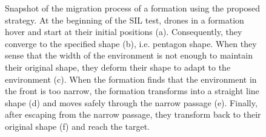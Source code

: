 \begin{figure}[h!]
\begin{subfigure}[b]{0.325\textwidth}
    \caption{}
    \end{subfigure}
    \caption{Snapshot of the migration process of a formation using the proposed strategy. At the beginning of the SIL test, drones in a formation hover and start at their initial positions (a). Consequently, they converge to the specified shape (b), i.e. pentagon shape. When they sense that the width of the environment is not enough to maintain their original shape, they deform their shape to adapt to the environment (c). When the formation finds that the environment in the front is too narrow, the formation transforms into a straight line shape (d) and moves safely through the narrow passage (e). Finally, after escaping from the narrow passage, they transform back to their original shape (f) and reach the target.}
    \label{fig:snap}
\end{figure}

